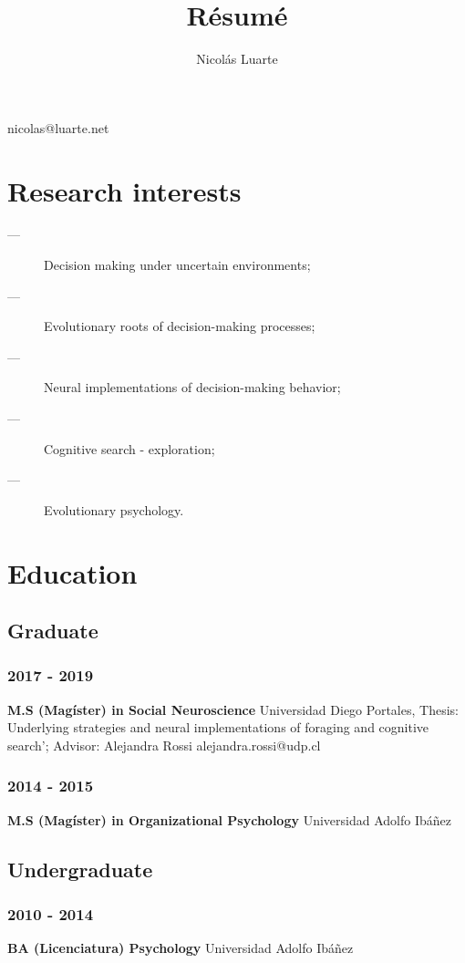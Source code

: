 \documentclass{article}
\makeatletter
\renewcommand{\maketitle}{
\begin{center}
{\huge\bfseries
\theauthor}

\vspace{.25em}

nicolas@luarte.net 

\vspace{.90em}

\end{center}
}
\makeatother
\begin{document}
\title{R\'esum\'e}
\author{Nicol\'as Luarte}


\maketitle
\section{Research interests}
\vspace{.90em}
\begin{description}
    \item[---]Decision making under uncertain environments;
    \item[---]Evolutionary roots of decision-making processes;
    \item[---]Neural implementations of decision-making behavior;
    \item[---]Cognitive search - exploration;
    \item[---]Evolutionary psychology.
\end{description}   
\section{Education}
\subsection{Graduate}\vspace{.90em}
\subsubsection{2017 -  2019}
\textbf{M.S (Mag\'ister) in Social Neuroscience} Universidad Diego Portales, Thesis: Underlying strategies and neural implementations of foraging and cognitive search'; Advisor: Alejandra Rossi alejandra.rossi@udp.cl
\subsubsection{2014 - 2015}
\textbf{M.S (Mag\'ister) in Organizational Psychology} Universidad Adolfo Ib\'a\~nez
\subsection{Undergraduate}\vspace{.90em}
\subsubsection{2010 - 2014}
\textbf{BA (Licenciatura) Psychology} Universidad Adolfo Ib\'a\~nez 
\end{document}
